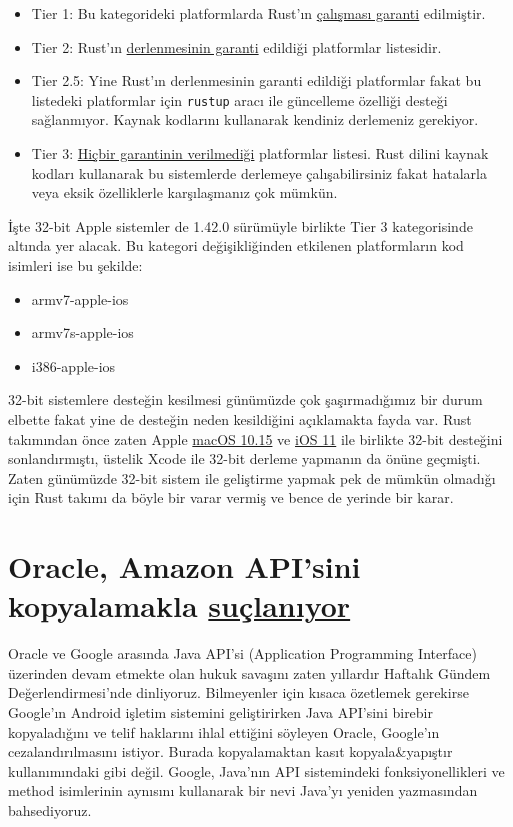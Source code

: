 \documentclass[11pt]{article}
\begin{document}
\begin{itemize}
\item Tier 1: Bu kategorideki platformlarda Rust'ın \uline{çalışması garanti} edilmiştir.
\item Tier 2: Rust'ın \uline{derlenmesinin garanti} edildiği platformlar listesidir.
\item Tier 2.5: Yine Rust'ın derlenmesinin garanti edildiği platformlar fakat bu
listedeki platformlar için \texttt{rustup} aracı ile güncelleme özelliği desteği
sağlanmıyor. Kaynak kodlarını kullanarak kendiniz derlemeniz gerekiyor.
\item Tier 3: \uline{Hiçbir garantinin verilmediği} platformlar listesi. Rust dilini
kaynak kodları kullanarak bu sistemlerde derlemeye çalışabilirsiniz fakat
hatalarla veya eksik özelliklerle karşılaşmanız çok mümkün.
\end{itemize}

İşte 32-bit Apple sistemler de 1.42.0 sürümüyle birlikte Tier 3 kategorisinde
altında yer alacak. Bu kategori değişikliğinden etkilenen platformların kod
isimleri ise bu şekilde:

\begin{itemize}
\item armv7-apple-ios
\item armv7s-apple-ios
\item i386-apple-ios
\end{itemize}

32-bit sistemlere desteğin kesilmesi günümüzde çok şaşırmadığımız bir durum
elbette fakat yine de desteğin neden kesildiğini açıklamakta fayda var. Rust
takımından önce zaten Apple \href{https://support.apple.com/en-us/HT208436}{macOS 10.15} ve \href{https://developer.apple.com/documentation/uikit/app\_and\_environment/updating\_your\_app\_from\_32-bit\_to\_64-bit\_architecture}{iOS 11} ile birlikte 32-bit desteğini
sonlandırmıştı, üstelik Xcode ile 32-bit derleme yapmanın da önüne geçmişti.
Zaten günümüzde 32-bit sistem ile geliştirme yapmak pek de mümkün olmadığı için
Rust takımı da böyle bir varar vermiş ve bence de yerinde bir karar.
\section{Oracle, Amazon API'sini kopyalamakla \href{https://arstechnica.com/tech-policy/2020/01/oracle-copied-amazons-api-was-that-copyright-infringement/}{suçlanıyor}}
\label{sec:org6fbfffb}
Oracle ve Google arasında Java API'si (Application Programming Interface)
üzerinden devam etmekte olan hukuk savaşını zaten yıllardır Haftalık Gündem
Değerlendirmesi'nde dinliyoruz. Bilmeyenler için kısaca özetlemek gerekirse
Google'ın Android işletim sistemini geliştirirken Java API'sini birebir
kopyaladığını ve telif haklarını ihlal ettiğini söyleyen Oracle, Google'ın
cezalandırılmasını istiyor. Burada kopyalamaktan kasıt kopyala\&yapıştır
kullanımındaki gibi değil. Google, Java'nın API sistemindeki fonksiyonellikleri
ve method isimlerinin aynısını kullanarak bir nevi Java'yı yeniden yazmasından
bahsediyoruz.
\end{document}
